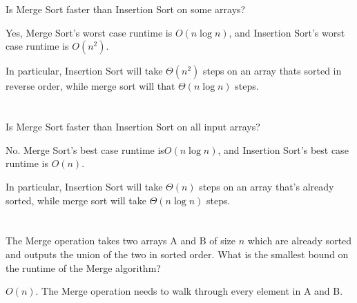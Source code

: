 \documentclass [12pt]{article}
\begin{document}
\section{}  Is Merge Sort faster than Insertion Sort on some arrays?

\begin{Solution}
Yes, Merge Sort’s worst case runtime is $O(n \log n)$, and Insertion Sort’s worst case runtime is $O(n^2)$.

In particular, Insertion Sort will take $\Theta(n^2)$ steps on an array thats sorted in reverse order, while merge sort will that $\Theta(n \log n)$ steps.
\end{Solution}


\section{} Is Merge Sort faster than Insertion Sort on all input arrays?

\begin{Solution}
No. Merge Sort’s best case runtime is$ O(n \log n)$, and Insertion Sort’s best case runtime is $O(n)$.

In particular, Insertion Sort will take $\Theta(n)$ steps on an array that's already sorted, while merge sort will take $\Theta(n \log n)$ steps.
\end{Solution}

\section{} The Merge operation takes two arrays A and B of size $n$ which are already sorted and outputs the union of the two in sorted order. What is the smallest bound on the runtime of the Merge algorithm?

\begin{Solution}
$O(n)$. The Merge operation needs to walk through every element in A and B.
\end{Solution}
\end{document}
